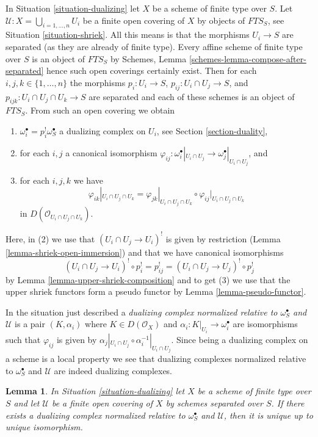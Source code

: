 \documentclass{stacks-project}
\theoremstyle{plain}
\newtheorem{lemma}[subsection]{Lemma}
\theoremstyle{definition}
\theoremstyle{remark}
\numberwithin{equation}{subsection}
\begin{document}
\noindent
In Situation \ref{situation-dualizing} let $X$ be a scheme of finite type
over $S$. Let $\mathcal{U} : X = \bigcup_{i = 1, \ldots, n} U_i$
be a finite open covering of $X$ by objects of $\textit{FTS}_S$, see
Situation \ref{situation-shriek}. All this means is that the morphisms
$U_i \to S$ are separated (as they are already of finite type).
Every affine scheme of finite type over $S$ is an object of $\textit{FTS}_S$
by Schemes, Lemma \ref{schemes-lemma-compose-after-separated}
hence such open coverings certainly exist.
Then for each $i, j, k \in \{1, \ldots, n\}$
the morphisms $p_i : U_i \to S$, $p_{ij} : U_i \cap U_j \to S$,
and $p_{ijk} : U_i \cap U_j \cap U_k \to S$ are separated and
each of these schemes is an object of $\textit{FTS}_S$.
From such an open covering we obtain
\begin{enumerate}
\item $\omega_i^\bullet = p_i^!\omega_S^\bullet$
a dualizing complex on $U_i$, see Section \ref{section-duality},
\item for each $i, j$ a canonical isomorphism
$\varphi_{ij} :
\omega_i^\bullet|_{U_i \cap U_j} \to \omega_j^\bullet|_{U_i \cap U_j}$, and
\item
\label{item-cocycle-glueing}
for each $i, j, k$ we have
$$
\varphi_{ik}|_{U_i \cap U_j \cap U_k} =
\varphi_{jk}|_{U_i \cap U_j \cap U_k} \circ
\varphi_{ij}|_{U_i \cap U_j \cap U_k}
$$
in $D(\mathcal{O}_{U_i \cap U_j \cap U_k})$.
\end{enumerate}
Here, in (2) we use that $(U_i \cap U_j \to U_i)^!$
is given by restriction (Lemma \ref{lemma-shriek-open-immersion})
and that we have canonical isomorphisms
$$
(U_i \cap U_j \to U_i)^! \circ p_i^! = p_{ij}^! =
(U_i \cap U_j \to U_j)^! \circ p_j^!
$$
by Lemma \ref{lemma-upper-shriek-composition} and to get (3) we use
that the upper shriek functors form a pseudo functor by
Lemma \ref{lemma-pseudo-functor}.

\medskip\noindent
In the situation just described a
{\it dualizing complex normalized relative to $\omega_S^\bullet$
and $\mathcal{U}$} is a pair $(K, \alpha_i)$ where $K \in D(\mathcal{O}_X)$
and $\alpha_i : K|_{U_i} \to \omega_i^\bullet$ are isomorphisms
such that $\varphi_{ij}$ is given by
$\alpha_j|_{U_i \cap U_j} \circ \alpha_i^{-1}|_{U_i \cap U_j}$.
Since being a dualizing complex on a scheme is a local property
we see that dualizing complexes normalized relative to $\omega_S^\bullet$
and $\mathcal{U}$ are indeed dualizing complexes.

\begin{lemma}
\label{lemma-good-dualizing-unique}
In Situation \ref{situation-dualizing} let $X$ be a scheme of finite type
over $S$ and let $\mathcal{U}$ be a finite open covering of $X$
by schemes separated over $S$. If there exists a dualizing complex
normalized relative to $\omega_S^\bullet$ and $\mathcal{U}$, then it is unique
up to unique isomorphism.
\end{lemma}
\end{document}
